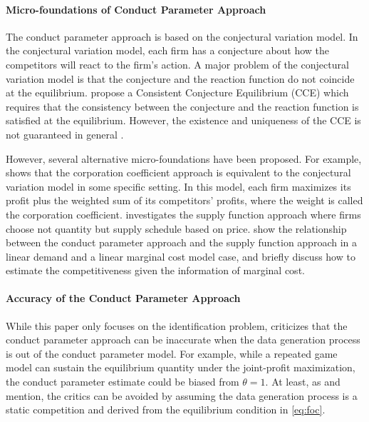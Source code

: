 \documentclass[11pt, a4paper]{article}
\begin{document}
\paragraph{Micro-foundations of Conduct Parameter Approach}
The conduct parameter approach is based on the conjectural variation model.
In the conjectural variation model, each firm has a conjecture about how the competitors will react to the firm's action.
A major problem of the conjectural variation model is that the conjecture and the reaction function do not coincide at the equilibrium.
\citet{bresnahanDuopoly1981,bresnahanExistence1983}  propose a Consistent Conjecture Equilibrium (CCE) which requires that the consistency between the conjecture and the reaction function is satisfied at the equilibrium.
However, the existence and uniqueness of the CCE is not guaranteed in general \citep{klempererConsistent1988,robsonExistence1983}.

However, several alternative micro-foundations have been proposed.
For example, \citet{escrihuela-villarNote2015} shows that the corporation coefficient approach is equivalent to the conjectural variation model in some specific setting.
In this model, each firm maximizes its profit plus the weighted sum of its competitors' profits, where the weight is called the corporation coefficient.
\citet{menezesStrategic2020} investigates the supply function approach where firms choose not quantity but supply schedule based on price.
\citet{menezesCompetition2023} show the relationship between the conduct parameter approach and the supply function approach in a linear demand and a linear marginal cost model case, and \citet{menezesStrategic2020} briefly discuss how to estimate the competitiveness given the information of marginal cost.



\paragraph{Accuracy of the Conduct Parameter Approach}
While this paper only focuses on the identification problem, \citet{cortsConduct1999} criticizes that the conduct parameter approach can be inaccurate when the data generation process is out of the conduct parameter model.
For example, while a repeated game model can sustain the equilibrium quantity under the joint-profit maximization, the conduct parameter estimate could be biased from $\theta = 1$.
At least, as \citet{cortsConduct1999} and \citet{magnolfiComparison2022} mention, the critics can be avoided by assuming the data generation process is a static competition and derived from the equilibrium condition in \eqref{eq:foc}.
\end{document}
